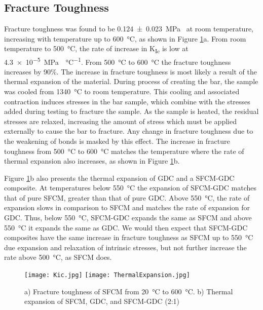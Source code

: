     \subsection{Fracture Toughness}
        Fracture toughness was found to be \SI[separate-uncertainty = true]{0.124 +- 0.023}{\mega\pascal{}} at room temperature, increasing with temperature up to \SI{600}{\celsius}, as shown in Figure \ref{fig:Kic}a.
        From room temperature to \SI{500}{\celsius}, the rate of increase in K\textsubscript{Ic} is low at \SI{4.3e-5}{\mega\pascal{}\per\celsius}.
        From \SI{500}{\celsius} to \SI{600}{\celsius} the fracture toughness increases by 90\%.
        The increase in fracture toughness is most likely a result of the thermal expansion of the material.
        During process of creating the bar, the sample was cooled from \SI{1340}{\celsius} to room temperature.
        This cooling and associated contraction induces stresses in the bar sample, which combine with the stresses added during testing to fracture the sample.
        As the sample is heated, the residual stresses are relaxed, increasing the amount of stress which must be applied externally to cause the bar to fracture.
        Any change in fracture toughness due to the weakening of bonds is masked by this effect.
        The increase in fracture toughness from \SI{500}{\celsius} to \SI{600}{\celsius} matches the temperature where the rate of thermal expansion also increases, as shown in Figure \ref{fig:Kic}b.

        Figure \ref{fig:Kic}b also presents the thermal expansion of GDC and a SFCM-GDC composite.
        At temperatures below \SI{550}{\celsius} the expansion of SFCM-GDC matches that of pure SFCM, greater than that of pure GDC.
        Above \SI{550}{\celsius}, the rate of expansion slows in comparison to SFCM and matches the rate of expansion for GDC.
        Thus, below \SI{550}{\celsius}, SFCM-GDC expands the same as SFCM and above \SI{550}{\celsius} it expands the same as GDC.
        We would then expect that SFCM-GDC composites have the same increase in fracture toughness as SFCM up to \SI{550}{\celsius} due expansion and relaxation of intrinsic stresses, but not further increase the rate above \SI{500}{\celsius}, as SFCM does.

        \begin{figure}
          \texttt{[image: Kic.jpg]}
          \texttt{[image: ThermalExpansion.jpg]}
          \caption{a) Fracture toughness of SFCM from \SI{20}{\celsius} to \SI{600}{\celsius}. b) Thermal expansion of SFCM, GDC, and SFCM-GDC (2:1)}
          \label{fig:Kic}
        \end{figure}

